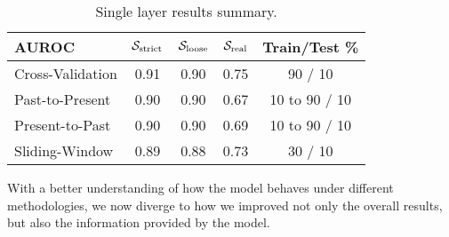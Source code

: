 \begin{table}[!htb]
	\renewcommand{\arraystretch}{1.2} %
	\centering
	\begin{tabular}{l|cccc}
		AUROC & $\mathcal{S}_{\mathrm{strict}}$ & $\mathcal{S}_{\mathrm{loose}}$ & $\mathcal{S}_{\mathrm{real}}$ & Train/Test \%\\
		\hline
		Cross-Validation & 0.91 & 0.90 & 0.75 & 90 / 10\\
		Past-to-Present & 0.90 & 0.90 & 0.67 & 10 to 90 / 10\\
		Present-to-Past & 0.90 & 0.90 & 0.69 & 10 to 90 / 10\\
		Sliding-Window & 0.89 & 0.88 & 0.73 & 30 / 10\\
		\hline
	\end{tabular}
	\smallskip
	\caption{Single layer results summary.}
	\label{tab:singlelayer_results}
\end{table}

\medskip

With a better understanding of how the model behaves under different methodologies, we now diverge to how we improved not only the overall results, but also the information provided by the model.
